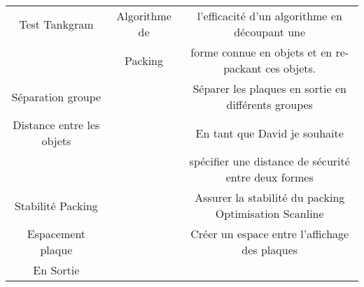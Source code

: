 \begin{table}[H]
{\begin{tabular}{|c|c|c|}
                             Test Tankgram & Algorithme de& l'efficacité d'un algorithme en découpant une\\
                             & Packing &forme connue en objets et en re-packant ces objets. \\ \hline
                             Séparation groupe& & Séparer les plaques en sortie en différents groupes \\ \hline
                             Distance entre les objets & & En tant que David je souhaite \\
                             && spécifier une distance de sécurité entre deux formes \\ \hline
                             Stabilité Packing & & Assurer la stabilité du packing 
                             Optimisation Scanline \\ \hline
                             Espacement plaque && Créer un espace entre l'affichage des plaques\\
                             En Sortie && \\ \hline
                             
                             
                            
\end{tabular}}
\end{table}

